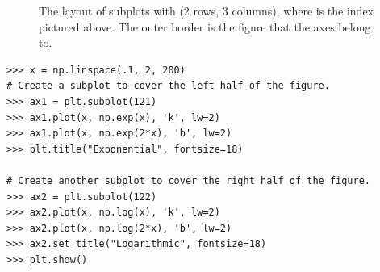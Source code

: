 \begin{figure}[H]
\begin{framed}
\begin{subfigure}{.32\textwidth}
\end{subfigure}
\end{framed}
\caption{The layout of subplots with  (2 rows, 3 columns), where  is the index pictured above. The outer border is the figure that the axes belong to.}
\label{fig:subplots-layout}
\end{figure}

\begin{lstlisting}
>>> x = np.linspace(.1, 2, 200)
# Create a subplot to cover the left half of the figure.
>>> ax1 = plt.subplot(121)
>>> ax1.plot(x, np.exp(x), 'k', lw=2)
>>> ax1.plot(x, np.exp(2*x), 'b', lw=2)
>>> plt.title("Exponential", fontsize=18)

# Create another subplot to cover the right half of the figure.
>>> ax2 = plt.subplot(122)
>>> ax2.plot(x, np.log(x), 'k', lw=2)
>>> ax2.plot(x, np.log(2*x), 'b', lw=2)
>>> ax2.set_title("Logarithmic", fontsize=18)
>>> plt.show()
\end{lstlisting}

